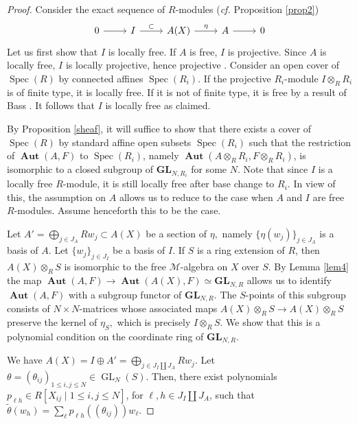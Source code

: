 \documentclass{article}
\theoremstyle{definition}
\def\Spec{\ensuremath{\operatorname{Spec}}}
\def\BAut{\ensuremath{\operatorname{\mathbf{Aut}}}}
\def\GL{\ensuremath{\operatorname{GL}}}
\def\BGL{\ensuremath{\mathbf{G}\mathbf{L}}}
\def\Mu{\ensuremath{\mathcal{M}}}
\begin{document}
\begin{proof} Consider the  exact sequence of $R$-modules ({\it cf.} Proposition \ref{prop2})
\[ \begin{tikzcd} 0 \ar[r] & I \ar[r, "\subset"] & A(X) \ar[r, "\eta"] & A \ar[r] & 0 \end{tikzcd} \]
Let us first show that $I$ is locally free. If $A$ is free, $I$ is projective. Since $A$ is locally free, $I$ is locally projective, hence projective \cite[Theorem 10.95.6]{SP}. Consider an open cover  of $\Spec(R)$ by connected affines $\Spec(R_i).$  If the projective $R_i$-module $I \otimes_R R_i$ is of finite type, it is locally free. If it is not of finite type, it is free by a result of Bass \cite{Bass}. It follows that $I$ is locally free as claimed.

By Proposition \ref{sheaf}, it will suffice to show that there exists a cover of $\Spec(R)$ by standard affine open subsets $\Spec(R_i)$ such that the restriction of $\BAut(A, F)$ to $\Spec(R_i)$, namely $\BAut(A \otimes_R R_i, F \otimes_R R_i)$, is isomorphic to a closed subgroup of $\BGL_{N,R_i}$ for some $N.$ Note that since $I$ is a locally free $R$-module, it is still locally free after base change to $R_i$. In view of this,  the assumption on  $A$  allows us to reduce to the case when $A$ and $I$ are free $R$-modules.  Assume henceforth this to be the case.   

 Let $A' = \bigoplus_{j \in J_A} Rw_j \subset A(X)$ be a section of $\eta,$ namely $\{\eta(w_j)\}_{j \in J_A}$ is a basis of $A.$ Let $\{w_j\}_{j \in J_I}$ be a basis of $I.$ If $S$ is a ring extension of $R$, then $A(X) \otimes_R S$ is isomorphic to the free $\Mu$-algebra on $X$ over $S$.
 By Lemma \ref{lem4} the map $\BAut(A,F) \to \BAut(A(X),F) \simeq \BGL_{N,R}$  allows us to identify $\BAut(A,F)$ with a subgroup functor of $ \BGL_{N,R}.$ The $S$-points of this subgroup consists of $N\! \times \!N$-matrices whose associated maps $A(X) \otimes_R S \to A(X) \otimes_R S$ preserve the kernel of $\eta_S,$ which is precisely $I \otimes_R S$. 
We show that this is a polynomial condition on the coordinate ring of $\BGL_{N,R}.$

We have $A(X) = I \oplus A' = \bigoplus_{j \in J_I \coprod J_A} R w_j$. 
Let $\theta = (\theta_{ij})_{1 \leq i, j \leq N} \in \GL_N(S)$. Then, there exist polynomials $p_{\ell h} \in R[X_{ij} \mid 1 \leq i,j \leq N]$, for $\ell, h \in J_I \coprod J_A$, such that $\widetilde \theta (w_h) = \sum_{\ell} p_{\ell h} ((\theta_{ij})) w_\ell$. 


\end{proof}
\end{document}
